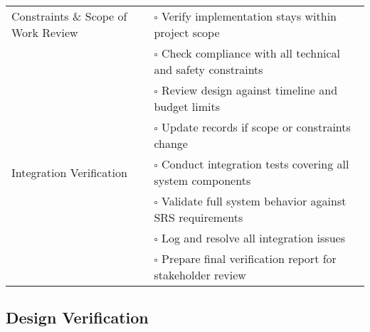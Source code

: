 \documentclass[12pt, titlepage]{article}
\begin{document}
\begin{table}[H]
\begin{tabular}{|p{4.4cm}|p{10.1cm}|}
    Constraints \& Scope of Work Review             & $\square$ \; Verify implementation stays
    within project scope                                                                                                                            \\[-2pt]
                                                    & $\square$ \; Check compliance with all technical and safety constraints                       \\[-2pt]
                                                    & $\square$ \; Review design against timeline and budget limits                                 \\[-2pt]
                                                    & $\square$ \; Update records if scope or constraints change                                    \\ \hline

    Integration Verification                        & $\square$ \; Conduct integration tests covering all
    system components                                                                                                                               \\[-2pt]
                                                    & $\square$ \; Validate full system behavior against SRS requirements                           \\[-2pt]
                                                    & $\square$ \; Log and resolve all integration issues                                           \\[-2pt]
                                                    & $\square$ \; Prepare final verification report for stakeholder review                         \\ \hline
  \end{tabular}
\end{table}



\subsection{Design Verification}
\end{document}
